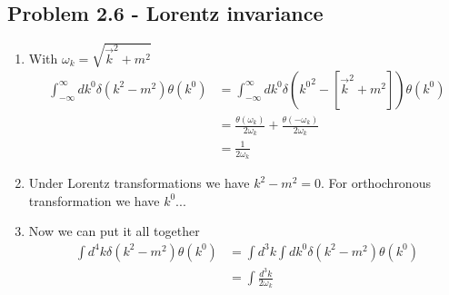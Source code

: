 \documentclass[../main.tex]{subfiles}
\begin{document}
\subsection{Problem 2.6 - Lorentz invariance}
\begin{enumerate}
    \item With $\omega_k=\sqrt{\vec{k}^2+m^2}$
    \begin{align}
        \int_{-\infty}^\infty dk^0\delta(k^2-m^2)\theta(k^0)
        &=\int_{-\infty}^\infty dk^0\delta({k^0}^2-[\vec{k}^2+m^2])\theta(k^0)\\
        &=\frac{\theta(\omega_k)}{2\omega_k}+\frac{\theta(-\omega_k)}{2\omega_k}\\
        &=\frac{1}{2\omega_k}
    \end{align}
    \item Under Lorentz transformations we have $k^2-m^2=0$. For orthochronous transformation we have $k^0 ...$
    \item Now we can put it all together
    \begin{align}
        \int d^4k\delta(k^2-m^2)\theta(k^0)
        &=\int d^3k\int dk^0\delta(k^2-m^2)\theta(k^0)\\
        &=\int\frac{d^3k}{2\omega_k}
    \end{align}
\end{enumerate}
\end{document}
